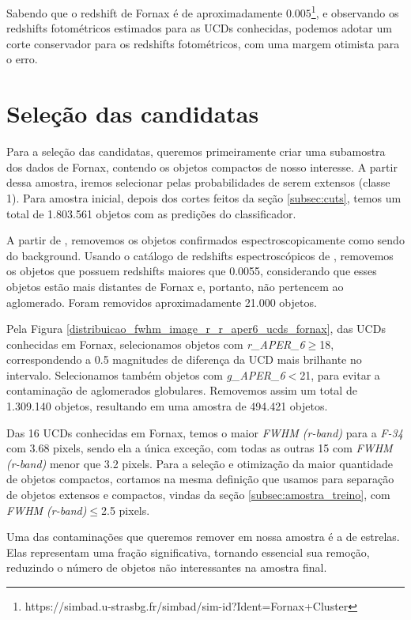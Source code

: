Sabendo que o redshift de Fornax é de aproximadamente $0.005$\footnote{https://simbad.u-strasbg.fr/simbad/sim-id?Ident=Fornax+Cluster}, e observando os redshifts fotométricos estimados para as UCDs conhecidas, podemos adotar um corte conservador para os redshifts fotométricos, com uma margem otimista para o erro.

\section{Seleção das candidatas}\label{sec:selecao_candidatas}
Para a seleção das candidatas, queremos primeiramente criar uma subamostra dos dados de Fornax, contendo os objetos compactos de nosso interesse. A partir dessa amostra, iremos selecionar pelas probabilidades de serem extensos (classe 1). Para amostra inicial, depois dos cortes feitos da seção \ref{subsec:cuts}, temos um total de 1.803.561 objetos com as predições do classificador. 

A partir de \cite{Su_2021}, removemos os objetos confirmados espectroscopicamente como sendo do background. Usando o catálogo de redshifts espectroscópicos de \cite{Lima_2024}, removemos os objetos que possuem redshifts maiores que 0.0055, considerando que esses objetos estão mais distantes de Fornax e, portanto, não pertencem ao aglomerado. Foram removidos aproximadamente 21.000 objetos.

Pela Figura \ref{distribuicao_fwhm_image_r_r_aper6_ucds_fornax}, das UCDs conhecidas em Fornax, selecionamos objetos com \textit{r\_APER\_6}$\geq$18, correspondendo a 0.5 magnitudes de diferença da UCD mais brilhante no intervalo. Selecionamos também objetos com \textit{g\_APER\_6}$<$21, para evitar a contaminação de aglomerados globulares. Removemos assim um total de 1.309.140 objetos, resultando em uma amostra de 494.421 objetos.

Das 16 UCDs conhecidas em Fornax, temos o maior \textit{FWHM (r-band)} para a \textit{F-34} com 3.68 pixels, sendo ela a única exceção, com todas as outras 15 com \textit{FWHM (r-band)} menor que 3.2 pixels. Para a seleção e otimização da maior quantidade de objetos compactos, cortamos na mesma definição que usamos para separação de objetos extensos e compactos, vindas da seção \ref{subsec:amostra_treino}, com \textit{FWHM (r-band)}$\leq$2.5 pixels.

Uma das contaminações que queremos remover em nossa amostra é a de estrelas. Elas representam uma fração significativa, tornando essencial sua remoção, reduzindo o número de objetos não interessantes na amostra final.

